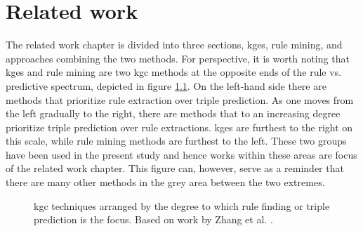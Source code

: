 \chapter{Related work}
\label{related_work}
The related work chapter is divided into three sections, \glspl{kge}, rule mining, and approaches combining the two methods. For perspective, it is worth noting that \glspl{kge} and rule mining are two \gls{kgc} methods at the opposite ends of the rule vs. predictive spectrum, depicted in figure \ref{scale}. On the left-hand side there are methods that prioritize rule extraction over triple prediction. As one moves from the left gradually to the right, there are methods that to an increasing degree prioritize triple prediction over rule extractions. \glspl{kge} are furthest to the right on this scale, while rule mining methods are furthest to the left. These two groups have been used in the present study and hence works within these areas are focus of the related work chapter. This figure can, however, serve as a reminder that there are many other methods in the grey area between the two extremes. 

\begin{figure}[htbp]
\centering

\caption[KGC techniques]{\gls{kgc} techniques arranged by the degree to which rule finding or triple prediction is the focus. Based on work by Zhang et al. \cite{neuralsymbolic}.}
\label{scale}
\end{figure}

